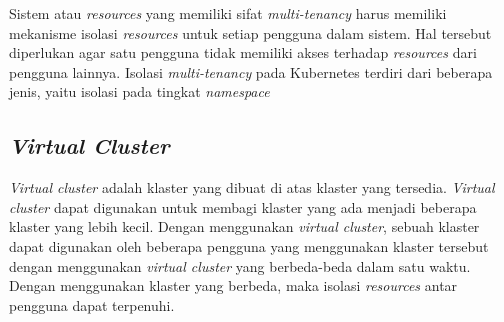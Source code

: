 Sistem atau \emph{resources} yang memiliki sifat \emph{multi-tenancy} harus memiliki
mekanisme isolasi \emph{resources} untuk setiap pengguna dalam sistem. Hal tersebut
diperlukan agar satu pengguna tidak memiliki akses terhadap \emph{resources} dari
pengguna lainnya. Isolasi \emph{multi-tenancy} pada Kubernetes terdiri dari beberapa
jenis, yaitu isolasi pada tingkat \emph{namespace}

\subsection{\emph{Virtual Cluster}}

\emph{Virtual cluster} adalah klaster yang dibuat di atas klaster yang tersedia.
\emph{Virtual cluster} dapat digunakan untuk membagi klaster yang ada menjadi beberapa
klaster yang lebih kecil. Dengan menggunakan \emph{virtual cluster}, sebuah klaster
dapat digunakan oleh beberapa pengguna yang menggunakan klaster tersebut dengan
menggunakan \emph{virtual cluster} yang berbeda-beda dalam satu waktu. Dengan
menggunakan klaster yang berbeda, maka isolasi \emph{resources} antar pengguna
dapat terpenuhi.

